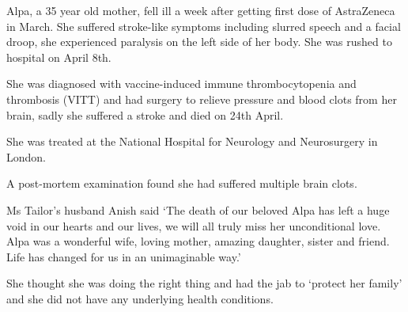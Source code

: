 Alpa, a 35 year old mother, fell ill a week after getting first dose of
AstraZeneca in March. She suffered stroke-like symptoms including slurred speech
and a facial droop, she experienced paralysis on the left side of her body. She
was rushed to hospital on April 8th.

She was diagnosed with vaccine-induced immune thrombocytopenia and thrombosis
(VITT) and had surgery to relieve pressure and blood clots from her brain, sadly
she suffered a stroke and died on 24th April.

She was treated at the National Hospital for Neurology and Neurosurgery in
London.

A post-mortem examination found she had suffered multiple brain clots.

Ms Tailor’s husband Anish said ‘The death of our beloved Alpa has left a huge
void in our hearts and our lives, we will all truly miss her unconditional
love. Alpa was a wonderful wife, loving mother, amazing daughter, sister and
friend. Life has changed for us in an unimaginable way.’

She thought she was doing the right thing and had the jab to ‘protect her
family’ and she did not have any underlying health conditions.

